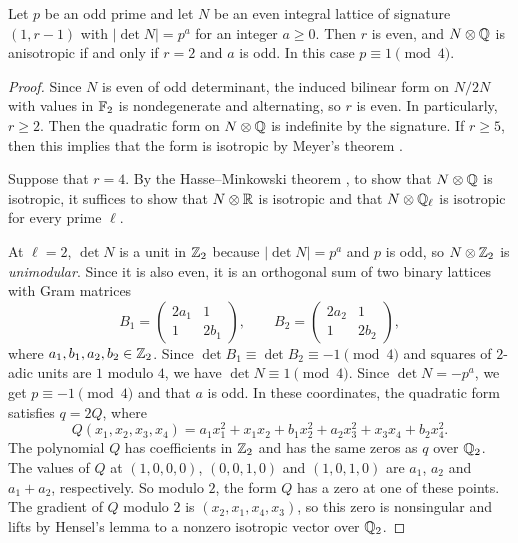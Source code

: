 \begin{lemma}\label{lem:lattice-dichotomy}
Let $p$ be an odd prime and let $N$ be an even integral lattice of signature $(1,r-1)$ with $\lvert\det N\rvert = p^a$ for an integer $a\geq 0$.
Then $r$ is even, and $N\otimes\mathbb{Q}$ is anisotropic if and only if $r = 2$ and $a$ is odd.
In this case $p\equiv 1\pmod 4$.
\end{lemma}

\begin{proof}
Since $N$ is even of odd determinant, the induced bilinear form on $N/2N$ with values in $\mathbb{F}_2$ is nondegenerate and alternating, so $r$ is even.
In particularly, $r\ge2$.
Then the quadratic form on $N\otimes\mathbb{Q}$ is indefinite by the signature.
If $r\geq 5$, then this implies that the form is isotropic by Meyer's theorem \cite[Chapter~IV, Section~3.2, Corollary~2 to Theorem~8]{Ser73}.

Suppose that $r = 4$.
By the Hasse--Minkowski theorem \cite[Chapter~IV, Section~3.2, Theorem~8]{Ser73}, to show that $N\otimes\mathbb{Q}$ is isotropic, it suffices to show that $N\otimes\mathbb{R}$ is isotropic and that $N\otimes\mathbb{Q}_\ell$ is isotropic for every prime $\ell$.

At $\ell = 2$, $\det N$ is a unit in $\mathbb{Z}_2$ because $\lvert\det N\rvert = p^a$ and $p$ is odd, so $N\otimes\mathbb{Z}_2$ is \emph{unimodular}.
Since it is also even, it is an orthogonal sum of two binary lattices with Gram matrices \cite[Hilfssatz~5]{Cas62}
\[
  B_1 = \begin{pmatrix}2a_1&1\\1&2b_1\end{pmatrix},\qquad
  B_2 = \begin{pmatrix}2a_2&1\\1&2b_2\end{pmatrix},
\]
where $a_1,b_1,a_2,b_2\in\mathbb{Z}_2$.
Since $\det B_1\equiv\det B_2\equiv -1\pmod 4$ and squares of $2$-adic units are $1$ modulo $4$, we have $\det N\equiv 1\pmod 4$.
Since $\det N = -p^a$, we get $p\equiv -1\pmod 4$ and that $a$ is odd.
In these coordinates, the quadratic form satisfies $q = 2Q$, where
\[
  Q(x_1,x_2,x_3,x_4) = a_1x_1^2+x_1x_2+b_1x_2^2+a_2x_3^2+x_3x_4+b_2x_4^2.
\]
The polynomial $Q$ has coefficients in $\mathbb{Z}_2$ and has the same zeros as $q$ over $\mathbb{Q}_2$.
The values of $Q$ at $(1,0,0,0)$, $(0,0,1,0)$ and $(1,0,1,0)$ are $a_1$, $a_2$ and $a_1+a_2$, respectively.
So modulo $2$, the form $Q$ has a zero at one of these points.
The gradient of $Q$ modulo $2$ is $(x_2,x_1,x_4,x_3)$, so this zero is nonsingular and lifts by Hensel's lemma to a nonzero isotropic vector over $\mathbb{Q}_2$.


\end{proof}
